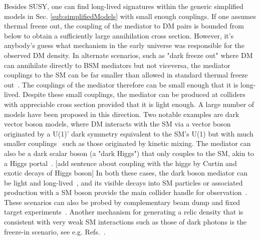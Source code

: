 Besides SUSY, one can find long-lived signatures within the generic simplified models in Sec. \ref{sub:simplifiedModels} with small enough couplings. If one assumes thermal freeze out, the coupling of the mediator to DM pairs is bounded from below to obtain a sufficiently large annihilation cross section. However, it's anybody's guess what mechanism in the early universe was responsible for the observed DM density. In alternate scenarios, such as "dark freeze out" where DM can annihilate directly to BSM mediators but not viceversa, the mediator couplings to the SM can be far smaller than allowed in standard thermal freeze out~\cite{Pospelov:2007mp,Das:2010ts}. The couplings of the mediator therefore can be small enough that it is long-lived. Despite these small couplings, the mediator can be produced at colliders with appreciable cross section provided that it is light enough. A large number of models have been proposed in this direction. Two notable examples are dark vector boson models, where DM interacts with the SM via a vector boson originated by a U(1)' dark symmetry equivalent to the SM's U(1) but with much smaller couplings~\cite{Holdom:1985ag} such as those originated by kinetic mixing. 
The mediator can also be a dark scalar boson (a "dark Higgs") that only couples to the SM, akin to a Higgs portal~\cite{Curtin:2014cca}. 
[add sentence about coupling with the higgs by Curtin and exotic decays of Higgs boson]
In both these cases, the dark boson mediator can be light and long-lived~\cite{Pospelov:2007mp}, and its visible decays into SM particles or associated production with a SM boson provide the main collider handle for observation~\cite{Curtin:2014cca}. These scenarios can also be probed by complementary beam dump and fixed target experiments~\cite{Battaglieri:2017aum}. %
Another mechanism for generating a relic density that is consistent with very weak SM interactions such as those of dark photons is the freeze-in scenario, see e.g. Refs.~\cite{Co:2015pka,Bernal:2017kxu}. 

